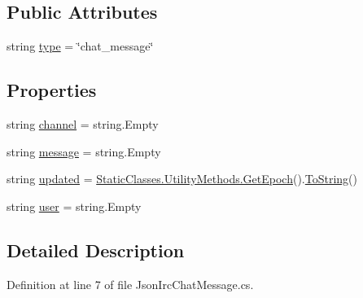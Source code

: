\subsection*{Public Attributes}
\begin{DoxyCompactItemize}
\item 
string \mbox{\hyperlink{class_little_weeb_library_1_1_models_1_1_json_irc_chat_message_a871a6538c19850731715e25c8e29cfef}{type}} = \char`\"{}chat\+\_\+message\char`\"{}
\end{DoxyCompactItemize}
\subsection*{Properties}
\begin{DoxyCompactItemize}
\item 
string \mbox{\hyperlink{class_little_weeb_library_1_1_models_1_1_json_irc_chat_message_a04341cbf5d66d4b35a6374bb84a80390}{channel}} = string.\+Empty
\item 
string \mbox{\hyperlink{class_little_weeb_library_1_1_models_1_1_json_irc_chat_message_a64ad5623d43a7389182f2b008cf8dcaa}{message}} = string.\+Empty
\item 
string \mbox{\hyperlink{class_little_weeb_library_1_1_models_1_1_json_irc_chat_message_aada65302045984832d2073e16bb0b05e}{updated}} = \mbox{\hyperlink{class_little_weeb_library_1_1_static_classes_1_1_utility_methods_a12336d9e64983ddabaad8950486fafb2}{Static\+Classes.\+Utility\+Methods.\+Get\+Epoch}}().\mbox{\hyperlink{class_little_weeb_library_1_1_models_1_1_json_irc_chat_message_ae54b09f8720f6ade5ed128496a4da690}{To\+String}}()
\item 
string \mbox{\hyperlink{class_little_weeb_library_1_1_models_1_1_json_irc_chat_message_afb6ca99e5b064d8beb30ea29c21110fb}{user}} = string.\+Empty
\end{DoxyCompactItemize}


\subsection{Detailed Description}


Definition at line 7 of file Json\+Irc\+Chat\+Message.\+cs.



